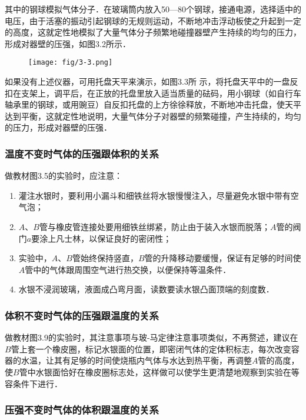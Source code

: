 其中的钢球模拟气体分子．在玻璃筒内放入50—80个钢球，接通电源，选择适中的电压，由于活塞的振动引起钢球的无规则运动，不断地冲击浮动板使之升起到一定的高度，这就定性地模拟了大量气体分子频繁地碰撞器壁产生持续的均匀的压力，形成对器壁的压强，如图3.2所示．

\begin{figure}[htp]
    \centering
\texttt{[image: fig/3-3.png]}
    \caption{}
\end{figure}

如果没有上述仪器，可用托盘天平来演示，如图3.3所
示，将托盘天平中的一盘反扣在支架上，调平后，在正放的托盘里放入适当质量的砝码，用小钢球（如自行车轴承里的钢球，或用豌豆）自反扣托盘的上方徐徐释放，不断地冲击托盘，使天平达到平衡，这就定性地说明，大量气体分子对器壁的频繁碰撞，产生持续的，均匀的压力，形成对器壁的压强．

\subsubsection{温度不变时气体的压强跟体积的关系}

做教材图3.5的实验时，应注意：
\begin{enumerate}
\item 灌注水银时，要利用小漏斗和细铁丝将水银慢慢注入，尽量避免水银中带有空气泡；
\item $A$、$B$管与橡皮管连接处要用细铁丝绑紧，防止由于装入水银而脱落；$A$管的阀门$a$要涂上凡士林，以保证良好的密闭性；
\item 实验中，$A$、$B$管始终保持竖直，$B$管的升降移动要缓慢，保证有足够的时间使$A$管中的气体跟周围空气进行热交换，以便保持等温条件．
\item 水银不浸润玻璃，液面成凸弯月面，读数要读水银凸面顶端的刻度数．
\end{enumerate}

\subsubsection{体积不变时气体的压强跟温度的关系}

做教材图3.9的实验时，其注意事项与玻-马定律注意事项类似，不再赘述，建议在$B$管上套一个橡皮圈，标记水银面的位置，即密闭气体的定体积标志，每次改变容器的水温，让其有足够的时间使烧瓶内气体与水达到热平衡，再调整$A$管的高度，使$B$管中水银面恰好在橡皮圈标志处，这样做可以使学生更清楚地观察到实验在等容条件下进行．

\subsubsection{压强不变时气体的体积跟温度的关系}

